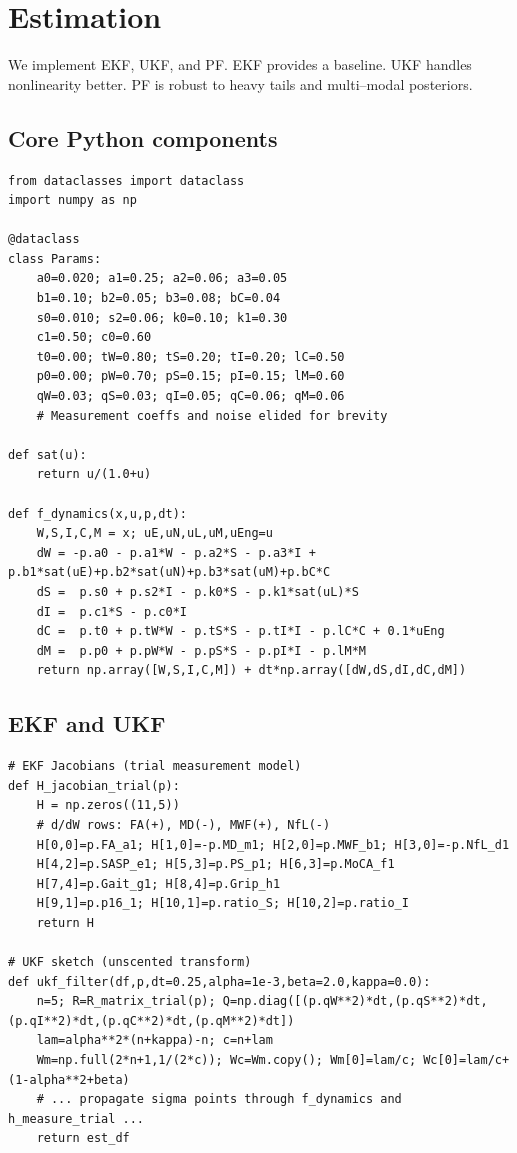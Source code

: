 \documentclass[11pt]{article}
\begin{document}
\section{Estimation}
We implement EKF, UKF, and PF. EKF provides a baseline. UKF handles nonlinearity better. PF is robust to heavy tails and multi--modal posteriors.

\subsection*{Core Python components}
\begin{lstlisting}
from dataclasses import dataclass
import numpy as np

@dataclass
class Params:
    a0=0.020; a1=0.25; a2=0.06; a3=0.05
    b1=0.10; b2=0.05; b3=0.08; bC=0.04
    s0=0.010; s2=0.06; k0=0.10; k1=0.30
    c1=0.50; c0=0.60
    t0=0.00; tW=0.80; tS=0.20; tI=0.20; lC=0.50
    p0=0.00; pW=0.70; pS=0.15; pI=0.15; lM=0.60
    qW=0.03; qS=0.03; qI=0.05; qC=0.06; qM=0.06
    # Measurement coeffs and noise elided for brevity

def sat(u):
    return u/(1.0+u)

def f_dynamics(x,u,p,dt):
    W,S,I,C,M = x; uE,uN,uL,uM,uEng=u
    dW = -p.a0 - p.a1*W - p.a2*S - p.a3*I + p.b1*sat(uE)+p.b2*sat(uN)+p.b3*sat(uM)+p.bC*C
    dS =  p.s0 + p.s2*I - p.k0*S - p.k1*sat(uL)*S
    dI =  p.c1*S - p.c0*I
    dC =  p.t0 + p.tW*W - p.tS*S - p.tI*I - p.lC*C + 0.1*uEng
    dM =  p.p0 + p.pW*W - p.pS*S - p.pI*I - p.lM*M
    return np.array([W,S,I,C,M]) + dt*np.array([dW,dS,dI,dC,dM])
\end{lstlisting}

\subsection*{EKF and UKF}
\begin{lstlisting}
# EKF Jacobians (trial measurement model)
def H_jacobian_trial(p):
    H = np.zeros((11,5))
    # d/dW rows: FA(+), MD(-), MWF(+), NfL(-)
    H[0,0]=p.FA_a1; H[1,0]=-p.MD_m1; H[2,0]=p.MWF_b1; H[3,0]=-p.NfL_d1
    H[4,2]=p.SASP_e1; H[5,3]=p.PS_p1; H[6,3]=p.MoCA_f1
    H[7,4]=p.Gait_g1; H[8,4]=p.Grip_h1
    H[9,1]=p.p16_1; H[10,1]=p.ratio_S; H[10,2]=p.ratio_I
    return H

# UKF sketch (unscented transform)
def ukf_filter(df,p,dt=0.25,alpha=1e-3,beta=2.0,kappa=0.0):
    n=5; R=R_matrix_trial(p); Q=np.diag([(p.qW**2)*dt,(p.qS**2)*dt,(p.qI**2)*dt,(p.qC**2)*dt,(p.qM**2)*dt])
    lam=alpha**2*(n+kappa)-n; c=n+lam
    Wm=np.full(2*n+1,1/(2*c)); Wc=Wm.copy(); Wm[0]=lam/c; Wc[0]=lam/c+(1-alpha**2+beta)
    # ... propagate sigma points through f_dynamics and h_measure_trial ...
    return est_df
\end{lstlisting}
\end{document}
